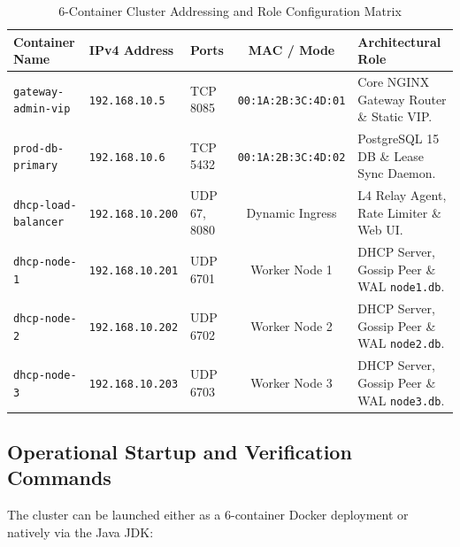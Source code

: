 \documentclass[11pt,a4paper]{article}
\begin{document}
\begin{table}[H]
\centering
\caption{6-Container Cluster Addressing and Role Configuration Matrix}
\label{tab:container_matrix}
\small
\begin{tabularx}{\textwidth}{@{}lllcY@{}}
\toprule
\textbf{Container Name} & \textbf{IPv4 Address} & \textbf{Ports} & \textbf{MAC / Mode} & \textbf{Architectural Role} \\ \midrule
\texttt{gateway-admin-vip} & \texttt{192.168.10.5} & TCP 8085 & \texttt{00:1A:2B:3C:4D:01} & Core NGINX Gateway Router \& Static VIP. \\
\texttt{prod-db-primary} & \texttt{192.168.10.6} & TCP 5432 & \texttt{00:1A:2B:3C:4D:02} & PostgreSQL 15 DB \& Lease Sync Daemon. \\
\texttt{dhcp-load-balancer} & \texttt{192.168.10.200} & UDP 67, 8080 & Dynamic Ingress & L4 Relay Agent, Rate Limiter \& Web UI. \\
\texttt{dhcp-node-1} & \texttt{192.168.10.201} & UDP 6701 & Worker Node 1 & DHCP Server, Gossip Peer \& WAL \texttt{node1.db}. \\
\texttt{dhcp-node-2} & \texttt{192.168.10.202} & UDP 6702 & Worker Node 2 & DHCP Server, Gossip Peer \& WAL \texttt{node2.db}. \\
\texttt{dhcp-node-3} & \texttt{192.168.10.203} & UDP 6703 & Worker Node 3 & DHCP Server, Gossip Peer \& WAL \texttt{node3.db}. \\ \bottomrule
\end{tabularx}
\end{table}

\subsection{Operational Startup and Verification Commands}
The cluster can be launched either as a 6-container Docker deployment or natively via the Java JDK:
\end{document}
